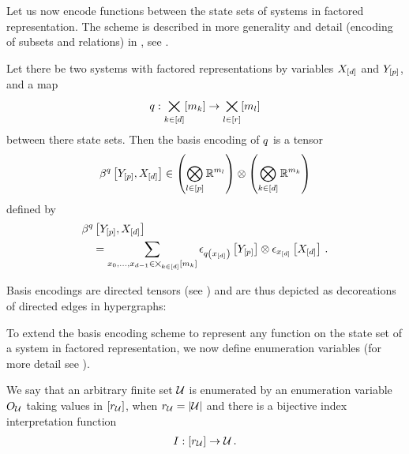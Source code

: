 
Let us now encode functions between the state sets of systems in factored representation.
The scheme is described in more generality and detail (encoding of subsets and relations) in , see .

\begin{definition}\label{def:functionRepresentation}
	Let there be two systems with factored representations by variables $X_{[d]}$ and $Y_{[p]}$, and a map
	\begin{align*}
		 q : \bigtimes_{k\in[d]}[m_{k}] \rightarrow  \bigtimes_{l\in[r]}[m_{l}]
	\end{align*}
	between there state sets.
	Then the basis encoding of $q$ is a tensor
	\begin{align*}
		\beta^{q}\left[Y_{[p]},X_{[d]}\right]
		\in \left(\bigotimes_{l\in[p]} \mathbb{R}^{m_{l}}\right) \otimes \left(\bigotimes_{k\in[d]} \mathbb{R}^{m_{k}}\right)
	\end{align*}
	defined by
	\begin{align*}
		& \beta^{q}\left[Y_{[p]},X_{[d]}\right] \\
		& \quad = \sum_{x_{0},\ldots,x_{d-1}\in\bigtimes_{k\in[d]}[m_{k}]}
		\epsilon_{q\left(x_{[d]}\right)}\left[Y_{[p]}\right] \otimes  \epsilon_{x_{[d]}}\left[X_{[d]}\right] \, .
	\end{align*}
\end{definition}

Basis encodings are directed tensors (see ) and are thus depicted as decoreations of directed edges in hypergraphs:
\begin{center}
	
\end{center}

To extend the basis encoding scheme to represent any function on the state set of a system in factored representation, we now define enumeration variables (for more detail see ).

\begin{definition}\label{def:indexinterpretationNotation}
    We say that an arbitrary finite set $\mathcal{U}$ is enumerated by an enumeration variable $O_{\mathcal{U}}$ taking values in $[r_{\mathcal{U}}]$, when $r_{\mathcal{U}}=\left|\mathcal{U}\right|$ and there is a bijective index interpretation function
    \begin{align*}
        I : [r_{\mathcal{U}}] \rightarrow \mathcal{U} \, .
    \end{align*}
\end{definition}

